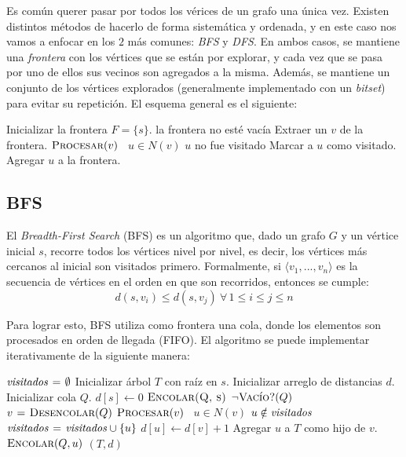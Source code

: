 \documentclass[a4paper]{report}
\newcommand{\Each}{\kw{each}\ }
\begin{document}
Es común querer pasar por todos los vérices de un grafo una única vez. Existen distintos métodos de hacerlo de forma sistemática y ordenada, y en este caso nos vamos a enfocar en los $2$ más comunes: \textit{BFS} y \textit{DFS}. En ambos casos, se mantiene una \textit{frontera} con los vértices que se están por explorar, y cada vez que se pasa por uno de ellos sus vecinos son agregados a la misma. Además, se mantiene un conjunto de los vértices explorados (generalmente implementado con un \textit{bitset}) para evitar su repetición. El esquema general es el siguiente:

\begin{codebox}
    \li Inicializar la frontera $F = \{s\}$.
    \li \While la frontera no esté vacía \Do
    \li Extraer un $v$ de la frontera.
    \li $\textnormal{\scshape Procesar}(v)$
    \li \For \Each $u \in N(v)$ \Do
    \li \If $u$ no fue visitado \Then
    \li Marcar a $u$ como visitado.
    \li Agregar $u$ a la frontera.
    \End
    \End
    \End
\end{codebox}

\subsection{BFS}

El \textit{Breadth-First Search} (BFS) es un algoritmo que, dado un grafo $G$ y un vértice inicial $s$, recorre todos los vértices nivel por nivel, es decir, los vértices más cercanos al inicial son visitados primero. Formalmente, si $\langle v_1, ..., v_n \rangle$ es la secuencia de vértices en el orden en que son recorridos, entonces se cumple:
$$d(s, v_i) \leq d(s, v_j)\ \forall\,1 \leq i \leq j \leq n$$

Para lograr esto, BFS utiliza como frontera una cola, donde los elementos son procesados en orden de llegada (FIFO). El algoritmo se puede implementar iterativamente de la siguiente manera:

\begin{codebox}
        \li $\id{visitados} \gets \emptyset$
        \li Inicializar árbol $T$ con raíz en $s$.
        \li Inicializar arreglo de distancias $d$.
        \li Inicializar cola $Q$.
        \li $d[s] \gets 0$
        \li $\textnormal{\scshape Encolar(Q, s)}$
        \li \While $\neg\textnormal{\scshape Vacío?}(Q)$ \Do
        \li $v \mathrel{\hspace{1pt}=\hspace{1pt}} \textnormal{\scshape Desencolar}(Q)$
        \li $\textnormal{\scshape Procesar}(v)$
        \li \For \Each $u \in N(v)$ \Do
        \li \If $u \notin \id{visitados}$ \Then
        \li $\id{visitados} \gets \id{visitados} \cup \{u\}$
        \li $d[u] \gets d[v] + 1$
        \li Agregar $u$ a $T$ como hijo de $v$.
        \li $\textnormal{\scshape Encolar}(Q, u)$
        \End
        \End
        \End
        \li \Return $(T, d)$
\end{codebox}
\end{document}
